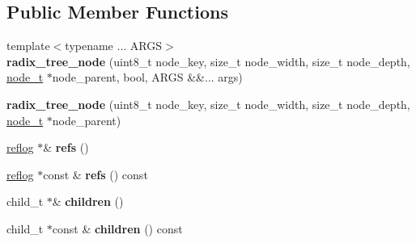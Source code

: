 \subsection*{Public Member Functions}
\begin{DoxyCompactItemize}
\item 
\mbox{\label{structdialog_1_1index_1_1radix__tree__node_afafdbd4fe0946b9813fd6e53144d12d7}} 
{\footnotesize template$<$typename ... A\+R\+GS$>$ }\\{\bfseries radix\+\_\+tree\+\_\+node} (uint8\+\_\+t node\+\_\+key, size\+\_\+t node\+\_\+width, size\+\_\+t node\+\_\+depth, \hyperlink{structdialog_1_1index_1_1radix__tree__node}{node\+\_\+t} $\ast$node\+\_\+parent, bool, A\+R\+GS \&\&... args)
\item 
\mbox{\label{structdialog_1_1index_1_1radix__tree__node_a230cf563a8b4e2dac324791b7b30bcd4}} 
{\bfseries radix\+\_\+tree\+\_\+node} (uint8\+\_\+t node\+\_\+key, size\+\_\+t node\+\_\+width, size\+\_\+t node\+\_\+depth, \hyperlink{structdialog_1_1index_1_1radix__tree__node}{node\+\_\+t} $\ast$node\+\_\+parent)
\item 
\mbox{\label{structdialog_1_1index_1_1radix__tree__node_a397829b9ff7017183deb7dcc2623d3d4}} 
\hyperlink{classdialog_1_1monolog_1_1monolog__exp2__linear}{reflog} $\ast$\& {\bfseries refs} ()
\item 
\mbox{\label{structdialog_1_1index_1_1radix__tree__node_ac0c04b6f6d5357feca1ebfd345d13707}} 
\hyperlink{classdialog_1_1monolog_1_1monolog__exp2__linear}{reflog} $\ast$const  \& {\bfseries refs} () const
\item 
\mbox{\label{structdialog_1_1index_1_1radix__tree__node_a2b99436aae6d96c0c4ceb612b4748a58}} 
child\+\_\+t $\ast$\& {\bfseries children} ()
\item 
\mbox{\label{structdialog_1_1index_1_1radix__tree__node_a5a6c3fc732f518c2ed3ec080afc468ba}} 
child\+\_\+t $\ast$const  \& {\bfseries children} () const
\item 
\mbox{\label{structdialog_1_1index_1_1radix__tree__node_a0305272882f54699ce555c1c8e72d5ba}} 

\end{DoxyCompactItemize}
